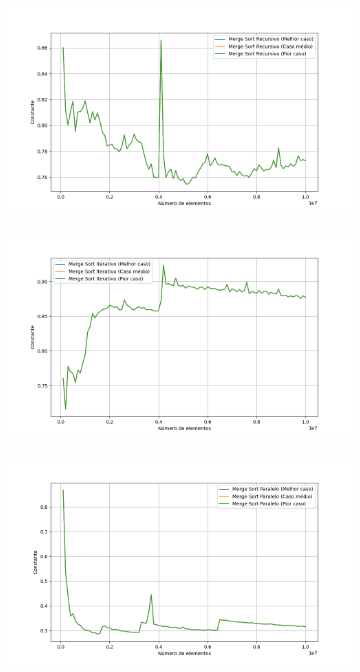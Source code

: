 \documentclass[12pt]{article}
\begin{document}
\begin{figure}[H]
    \caption{Constante do Merge Sort com dados decrescentes}
    \centering
    \begin{subfigure}{0.49\textwidth}
        \centering
        \includegraphics[width=\linewidth]{complexity_descending_recursive_mergesort.png}
        \label{fig:imagem1}
    \end{subfigure}
    \hfill
    \begin{subfigure}{0.49\textwidth}
        \centering
        \includegraphics[width=\linewidth]{complexity_descending_iterative_mergesort.png}
        \label{fig:imagem2}
    \end{subfigure}
    \begin{subfigure}{0.49\textwidth}
        \centering
        \includegraphics[width=\linewidth]{complexity_descending_parallel_mergesort.png}
        \label{fig:imagem3}
    \end{subfigure}
    \label{fig:desc_c}
\end{figure}
\end{document}
